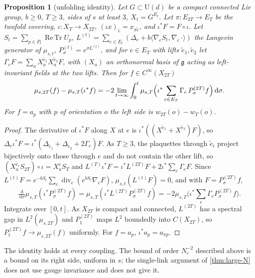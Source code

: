 \documentclass[11pt,a4paper]{amsart}
\newtheorem{proposition}[theorem]{Proposition}
\theoremstyle{definition}
\theoremstyle{remark}
\numberwithin{equation}{section}
\DeclareMathOperator{\ReTr}{Re\,Tr}  %
\newcommand{\ip}[2]{\langle #1,#2\rangle}  %
\newcommand{\dd}{\,\mathrm{d}}             %
\newcommand{\U}{\mathrm{U}}                %
\begin{document}
\begin{proposition}[unfolding identity]\label{prop:unfolding}
Let $G\subset\U(d)$ be a compact connected Lie group, $b\ge0$, $T\ge3$, sides of $s$ at least $3$, $X_t=G^{E_t}$. Let $\pi:E_{2T}\to E_T$ be the twofold covering, $\iota:X_T\to X_{2T}$, $(\iota x)_{\tilde e}=x_{\pi\tilde e}$, and $\iota^*F=F\circ\iota$. Let $S_t=\sum_{p\in P_t}\ReTr U_p$, $L^{(t)}=\sum_{e\in E_t}(\Delta_e+b\ip{\nabla_eS_t}{\nabla_e\,\cdot})$ the Langevin generator of $\mu_{s,t}$, $P^{(t)}_\sigma=e^{\sigma L^{(t)}}$, and for $e\in E_T$ with lifts $\tilde e_1,\tilde e_2$ let $\Gamma_eF=\sum_aX_a^{\tilde e_1}X_a^{\tilde e_2}F$, with $(X_a)$ an orthonormal basis of $\mathfrak g$ acting as left-invariant fields at the two lifts. Then for $f\in C^\infty(X_{2T})$
\begin{equation}\label{eq:unfolding}
\mu_{s,2T}(f)-\mu_{s,T}(\iota^*f)=-2\lim_{t\to\infty}\int_0^{t}\mu_{s,T}\Bigl(\iota^*\sum_{e\in E_T}\Gamma_e\,P^{(2T)}_\sigma f\Bigr)\dd\sigma .
\end{equation}
For $f=a_p$ with $p$ of orientation $o$ the left side is $w_{2T}(o)-w_T(o)$.
\end{proposition}

\begin{proof}
The derivative of $\iota^*F$ along $X$ at $e$ is $\iota^*((X^{\tilde e_1}+X^{\tilde e_2})F)$, so $\Delta_e\iota^*F=\iota^*(\Delta_{\tilde e_1}+\Delta_{\tilde e_2}+2\Gamma_e)F$. As $T\ge3$, the plaquettes through $\tilde e_i$ project bijectively onto those through $e$ and do not contain the other lift, so $(X_a^{\tilde e_i}S_{2T})\circ\iota=X_a^eS_T$ and $L^{(T)}\iota^*F=\iota^*L^{(2T)}F+2\iota^*\sum_e\Gamma_eF$. Since $L^{(t)}F=e^{-bS_t}\sum_e\operatorname{div}_e(e^{bS_t}\nabla_eF)$, $\mu_{s,t}(L^{(t)}F)=0$, and with $F=P^{(2T)}_\sigma f$,
\[
\tfrac{\dd}{\dd\sigma}\mu_{s,T}(\iota^*P^{(2T)}_\sigma f)=\mu_{s,T}(\iota^*L^{(2T)}P^{(2T)}_\sigma f)=-2\mu_{s,T}\bigl(\iota^*\textstyle\sum_e\Gamma_eP^{(2T)}_\sigma f\bigr).
\]
Integrate over $[0,t]$. As $X_{2T}$ is compact and connected, $L^{(2T)}$ has a spectral gap in $L^2(\mu_{s,2T})$ and $P^{(2T)}_1$ maps $L^2$ boundedly into $C(X_{2T})$, so $P^{(2T)}_tf\to\mu_{s,2T}(f)$ uniformly. For $f=a_p$, $\iota^*a_p=a_{\pi p}$.
\end{proof}

The identity holds at every coupling. The bound of order $N_c^{-2}$ described above is a bound on its right side, uniform in $s$; the single-link argument of \cref{thm:large-N} does not use gauge invariance and does not give it.
\end{document}
